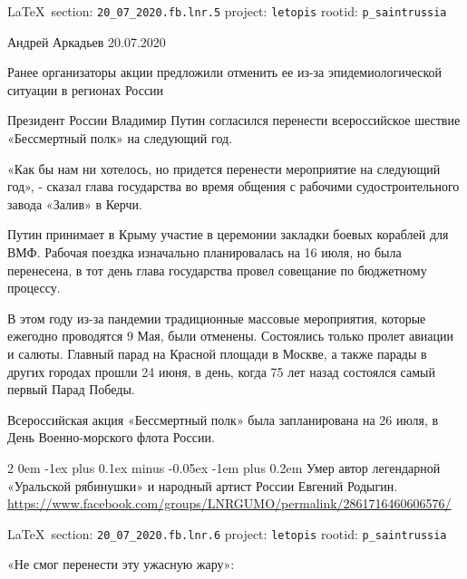 \documentclass[a4paper,11pt]{extreport}
\makeatletter
\renewcommand\subsection{%
  \clearpage
    \@startsection{subsection}%
    {2}%
    {0em}%
    {-1ex plus 0.1ex minus -0.05ex}%
    {-1em plus 0.2em}%
    {\scshape\bfseries\Large}%
}
\makeatother
\begin{document}
\vspace{0.5cm}
{\small\LaTeX~section: \verb|20_07_2020.fb.lnr.5| project: \verb|letopis| rootid: \verb|p_saintrussia|}
\vspace{0.5cm}

Андрей Аркадьев 20.07.2020

Ранее организаторы акции предложили отменить ее из-за эпидемиологической
ситуации в регионах России

Президент России Владимир Путин согласился перенести всероссийское шествие
«Бессмертный полк» на следующий год.

«Как бы нам ни хотелось, но придется перенести мероприятие на следующий год», -
сказал глава государства во время общения с рабочими судостроительного завода
«Залив» в Керчи.

Путин принимает в Крыму участие в церемонии закладки боевых кораблей для ВМФ.
Рабочая поездка изначально планировалась на 16 июля, но была перенесена, в тот
день глава государства провел совещание по бюджетному процессу.

В этом году из-за пандемии традиционные массовые мероприятия, которые ежегодно
проводятся 9 Мая, были отменены. Состоялись только пролет авиации и салюты.
Главный парад на Красной площади в Москве, а также парады в других городах
прошли 24 июня, в день, когда 75 лет назад состоялся самый первый Парад Победы.

Всероссийская акция «Бессмертный полк» была запланирована на 26 июля, в День
Военно-морского флота России. 
 
 

\subsection{Умер автор легендарной «Уральской рябинушки» и народный артист России Евгений Родыгин.}
\label{sec:20_07_2020.fb.lnr.6}
\url{https://www.facebook.com/groups/LNRGUMO/permalink/2861716460606576/}
  
\vspace{0.5cm}
{\small\LaTeX~section: \verb|20_07_2020.fb.lnr.6| project: \verb|letopis| rootid: \verb|p_saintrussia|}
\vspace{0.5cm}

«Не смог перенести эту ужасную жару»:
\end{document}
